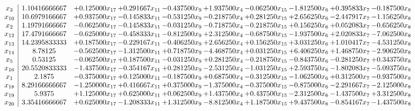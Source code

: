\documentclass[10pt]{article}
\begin{document}
 \[\begin{array}{c| c c@{\hskip 2pt} c@{\hskip 2pt} c@{\hskip 2pt} c@{\hskip 2pt} c@{\hskip 2pt} c@{\hskip 2pt} c@{\hskip 2pt} c@{\hskip 2pt} }
 x_{3}   &  1.10416666667 & + 0.125000 x_{17} & + 0.291667 x_{11} & -0.437500 x_{9} & + 1.937500 x_{4} & -0.062500 x_{15} & -1.812500 x_{6} & + 0.395833 x_{7} & -0.187500 x_{8}\\
 x_{10}   &  10.6979166667 & + 0.937500 x_{17} & -0.145833 x_{11} & -0.531250 x_{9} & -0.218750 x_{4} & + 0.281250 x_{15} & + 2.656250 x_{6} & -2.447917 x_{7} & -1.156250 x_{8}\\
 x_{2}   &  1.19791666667 & -0.062500 x_{17} & -0.145833 x_{11} & -0.031250 x_{9} & -0.718750 x_{4} & -0.218750 x_{15} & + 0.156250 x_{6} & + 0.052083 x_{7} & -0.656250 x_{8}\\
 x_{12}   &  17.4791666667 & -0.625000 x_{17} & -0.458333 x_{11} & -0.812500 x_{9} & + 2.312500 x_{4} & -0.687500 x_{15} & -1.937500 x_{6} & + 2.020833 x_{7} & -7.062500 x_{8}\\
 x_{13}   &  14.2395833333 & + 0.187500 x_{17} & -0.229167 x_{11} & -0.406250 x_{9} & + 2.656250 x_{4} & + 0.156250 x_{15} & + 3.031250 x_{6} & + 1.010417 x_{7} & -4.531250 x_{8}\\
 x_{14}   &  8.78125 & -0.562500 x_{17} & -1.312500 x_{11} & + 0.718750 x_{9} & -4.468750 x_{4} & + 0.031250 x_{15} & + 6.406250 x_{6} & + 1.468750 x_{7} & -2.906250 x_{8}\\
 x_{5}   &  0.53125 & -0.062500 x_{17} & + 0.187500 x_{11} & -0.031250 x_{9} & + 0.281250 x_{4} & -0.218750 x_{15} & -0.843750 x_{6} & -0.281250 x_{7} & + 0.343750 x_{8}\\
 x_{16}   &  20.5520833333 & -1.437500 x_{17} & -0.354167 x_{11} & + 0.281250 x_{9} & -2.531250 x_{4} & -1.031250 x_{15} & + 2.593750 x_{6} & -1.802083 x_{7} & -5.093750 x_{8}\\
 x_{1}   &  2.1875 & -0.375000 x_{17} & + 0.125000 x_{11} & -0.187500 x_{9} & + 0.687500 x_{4} & -0.312500 x_{15} & -1.062500 x_{6} & + 0.312500 x_{7} & -0.937500 x_{8}\\
 x_{18}   &  8.29166666667 & -1.250000 x_{17} & + 0.416667 x_{11} & + 0.375000 x_{9} & -1.375000 x_{4} & -0.375000 x_{15} & -0.875000 x_{6} & -2.291667 x_{7} & -2.125000 x_{8}\\
 x_{19}   &  5.9375 & + 1.125000 x_{17} & + 0.625000 x_{11} & + 0.062500 x_{9} & + 1.437500 x_{4} & + 0.437500 x_{15} & -2.312500 x_{6} & -1.437500 x_{7} & + 3.312500 x_{8}\\
 x_{20}   &  3.35416666667 & + 0.625000 x_{17} & -1.208333 x_{11} & + 1.312500 x_{9} & -8.812500 x_{4} & + 1.187500 x_{15} & + 9.437500 x_{6} & -0.854167 x_{7} & -1.437500 x_{8}\\

\end{array}\]
\end{document}
